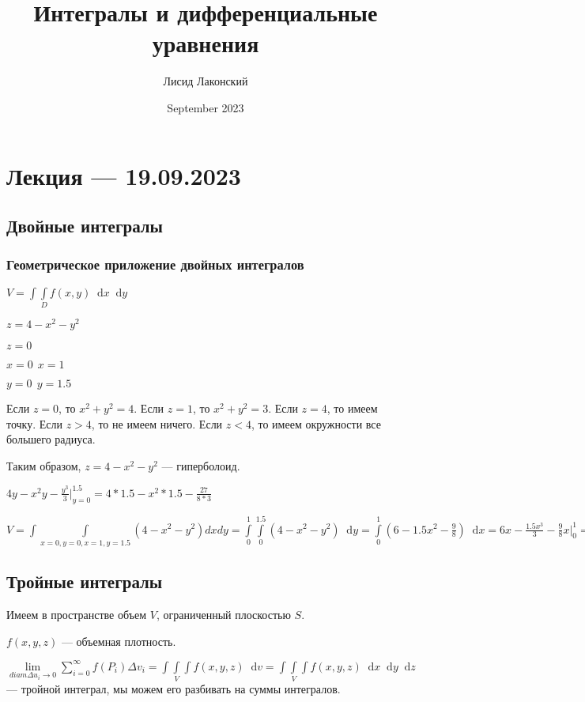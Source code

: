 \documentclass{article}
\title{Интегралы и дифференциальные уравнения}
\author{Лисид Лаконский}
\date{September 2023}
\newcommand*\diff{\mathop{}\!\mathrm{d}}
\begin{document}
\raggedright

\maketitle

\tableofcontents
\pagebreak

\section{Лекция — 19.09.2023}

\subsection{Двойные интегралы}

\subsubsection{Геометрическое приложение двойных интегралов}

$V = \int\int\limits_{D} f(x, y) \diff x \diff y$

$z = 4 - x^2 - y^2$

$z = 0$

$x = 0 \ \ x = 1$

$y = 0 \ \ y = 1.5$

Если $z = 0$, то $x^2+y^2 = 4$. Если $z = 1$, то $x^2+y^2 = 3$. Если $z = 4$, то имеем точку. Если $z > 4$, то не имеем ничего. Если $z < 4$, то имеем окружности все большего радиуса.

Таким образом, $z = 4 - x^2 - y^2$ — гиперболоид.

$4y-x^2y - \frac{y^3}{3} \bigg|_{y=0}^{1.5} = 4 * 1.5 - x^2 * 1.5 - \frac{27}{8*3}$

$V = \int\int\limits_{x=0,y=0,x=1,y=1.5} (4-x^2-y^2) dx dy = \int\limits_{0}^{1} \int\limits_{0}^{1.5} (4-x^2-y^2) \diff y = \int\limits_{0}^{1} (6-1.5x^2 - \frac{9}{8}) \diff x = 6x - \frac{1.5 x^3}{3} - \frac{9}{8} x \bigg|_{0}^{1} = 6 - \frac{1}{2} - \frac{9}{8} = \dots$

\subsection{Тройные интегралы}

Имеем в пространстве объем $V$, ограниченный плоскостью $S$.

$f(x, y, z)$ — объемная плотность.

$\lim\limits_{diam \Delta u_i \to 0} \sum\limits_{i = 0}^{\infty} f(P_i) \Delta v_i = \int\int\limits_{V}\int f(x, y, z) \diff v = \int\int\limits_{V} \int f(x, y, z) \diff x \diff y \diff z$ — тройной интеграл, мы можем его разбивать на суммы интегралов.
\end{document}
